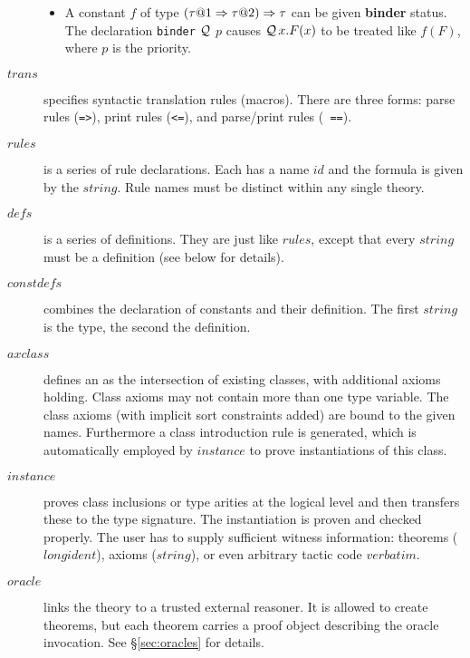 \begin{description}
\begin{itemize}
  \item A constant $f$ of type $(\tau@1\To\tau@2)\To\tau$ can be given {\bf
    binder} status.  The declaration \texttt{binder} $\cal Q$ $p$ causes
  ${\cal Q}\,x.F(x)$ to be treated
  like $f(F)$, where $p$ is the priority.
  \end{itemize}

\item[$trans$]
  specifies syntactic translation rules (macros).  There are three forms:
  parse rules (\texttt{=>}), print rules (\texttt{<=}), and parse/print rules ({\tt
  ==}).

\item[$rules$]
  is a series of rule declarations.  Each has a name $id$ and the formula is
  given by the $string$.  Rule names must be distinct within any single
  theory.

\item[$defs$] is a series of definitions.  They are just like $rules$, except
  that every $string$ must be a definition (see below for details).

\item[$constdefs$] combines the declaration of constants and their
  definition.  The first $string$ is the type, the second the definition.
  
\item[$axclass$]  defines an  \cite{Wenzel:1997:TPHOL} as the intersection of existing classes,
  with additional axioms holding.  Class axioms may not contain more than one
  type variable.  The class axioms (with implicit sort constraints added) are
  bound to the given names.  Furthermore a class introduction rule is
  generated, which is automatically employed by $instance$ to prove
  instantiations of this class.
  
\item[$instance$]  proves class inclusions or
  type arities at the logical level and then transfers these to the
  type signature.  The instantiation is proven and checked properly.
  The user has to supply sufficient witness information: theorems
  ($longident$), axioms ($string$), or even arbitrary \ML{} tactic
  code $verbatim$.

\item[$oracle$] links the theory to a trusted external reasoner.  It is
  allowed to create theorems, but each theorem carries a proof object
  describing the oracle invocation.  See \S\ref{sec:oracles} for details.
  

\end{description}
